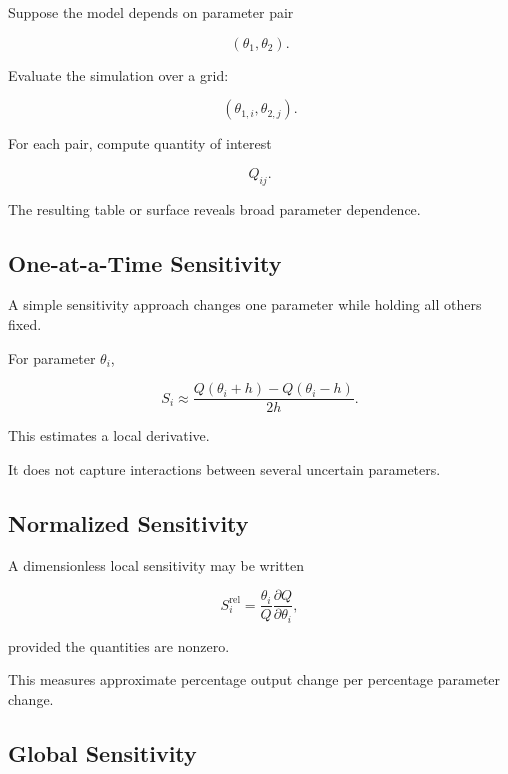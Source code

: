 Suppose the model depends on parameter pair

\[
(\theta_1,\theta_2).
\]

Evaluate the simulation over a grid:

\[
\boxed{
(\theta_{1,i},\theta_{2,j}).
}
\]

For each pair, compute quantity of interest

\[
\boxed{
Q_{ij}.
}
\]

The resulting table or surface reveals broad parameter dependence.

\subsection{One-at-a-Time Sensitivity}
\label{subsec:one-at-a-time-sensitivity}

A simple sensitivity approach changes one parameter while holding all
others fixed.

For parameter \(\theta_i\),

\[
\boxed{
S_i
\approx
\frac{
Q(\theta_i+h)-Q(\theta_i-h)
}{
2h
}.
}
\]

This estimates a local derivative.

It does not capture interactions between several uncertain parameters.

\subsection{Normalized Sensitivity}
\label{subsec:normalized-sensitivity}

A dimensionless local sensitivity may be written

\[
\boxed{
S_i^{\mathrm{rel}}
=
\frac{
\theta_i
}{
Q
}
\frac{
\partial Q
}{
\partial\theta_i
},
}
\]

provided the quantities are nonzero.

This measures approximate percentage output change per percentage parameter
change.

\subsection{Global Sensitivity}
\label{subsec:simulation-global-sensitivity}

